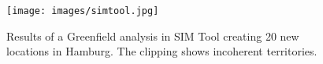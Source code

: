 \begin{figure}[H]
	\centering
	\texttt{[image: images/simtool.jpg]}
	\caption[Results of a Greenfield analysis in SIM Tool creating 20 new locations in Hamburg.]{Results of a Greenfield analysis in SIM Tool creating 20 new locations in Hamburg. The clipping shows incoherent territories.}
\end{figure}

